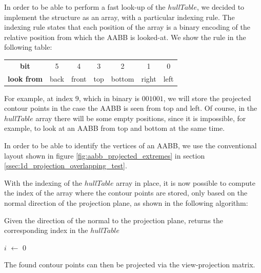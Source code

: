 \documentclass{PoliMi_MasterThesis}
\newcommand*\Let[2]{\State #1 $\gets$ #2}
\begin{document}
In order to be able to perform a fast look-up of the $hullTable$, we decided to implement the structure as an array, with a particular indexing rule. The indexing rule states that each position of the array is a binary encoding of the relative position from which the AABB is looked-at. We show the rule in the following table:

\begin{tabular}{| c | c | c | c | c | c | c |}
	\hline
	\textbf{bit} & 5 & 4 & 3 & 2 & 1 & 0 \\
	\textbf{look from} & back & front & top & bottom & right & left \\
	\hline
\end{tabular}

For example, at index $9$, which in binary is $001001$, we will store the projected contour points in the case the AABB is seen from top and left. Of course, in the $hullTable$ array there will be some empty positions, since it is impossible, for example, to look at an AABB from top and bottom at the same time.

In order to be able to identify the vertices of an AABB, we use the conventional layout shown in figure \ref{fig:aabb_projected_extremes} in section \ref{ssec:1d_projection_overlapping_test}.

With the indexing of the $hullTable$ array in place, it is now possible to compute the index of the array where the contour points are stored, only based on the normal direction of the projection plane, as shown in the following algorithm:

\begin{algorithm}[H]
	\caption{Given the direction of the normal to the projection plane, returns the corresponding index in the $hullTable$}
	\begin{algorithmic}[1]
		\Let{$i$}{0}
		\State{$\textbf{if}\; dir.x > 0 \; \textbf{then} \; i |= 1$}
		\State {}
		\EndFunction
	\end{algorithmic}
\end{algorithm} 

The found contour points can then be projected via the view-projection matrix.
\end{document}
